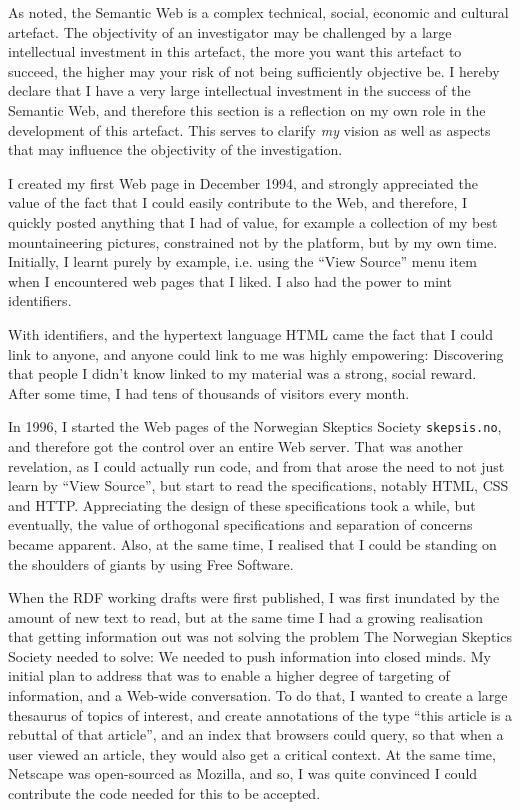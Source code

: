 As noted, the Semantic Web is a complex technical, social, economic
and cultural artefact. The objectivity of an investigator may be
challenged by a large intellectual investment in this artefact, the
more you want this artefact to succeed, the higher may your risk of
not being sufficiently objective be. I hereby declare that I have a
very large intellectual investment in the success of the Semantic Web,
and therefore this section is a reflection on my own role in the
development of this artefact. This serves to clarify \emph{my} vision
as well as aspects that may influence the objectivity of the
investigation.

I created my first Web page in December 1994, and strongly appreciated
the value of the fact that I could easily contribute to the Web, and
therefore, I quickly posted anything that I had of value, for example
a collection of my best mountaineering pictures, constrained not by
the platform, but by my own time. Initially, I learnt purely by
example, i.e. using the ``View Source'' menu item when I encountered
web pages that I liked. I also had the power to mint identifiers. 

With identifiers, and the hypertext language HTML came the fact that I
could link to anyone, and anyone could link to me was highly
empowering: Discovering that people I didn't know linked to my
material was a strong, social reward. After some time, I had tens of
thousands of visitors every month.

In 1996, I started the Web pages of the Norwegian Skeptics Society
\texttt{skepsis.no}, and therefore got the control over an entire Web
server. That was another revelation, as I could actually run code, and
from that arose the need to not just learn by ``View Source'', but
start to read the specifications, notably HTML, CSS and
HTTP. Appreciating the design of these specifications took a while,
but eventually, the value of orthogonal specifications and separation
of concerns became apparent. Also, at the same time, I realised that I
could be standing on the shoulders of giants by using Free Software.

When the RDF working drafts were first published, I was first
inundated by the amount of new text to read, but at the same time I
had a growing realisation that getting information out was not solving
the problem The Norwegian Skeptics Society needed to solve: We needed
to push information into closed minds. My initial plan to address that
was to enable a higher degree of targeting of information, and a Web-wide
conversation. To do that, I wanted to create a large thesaurus of
topics of interest, and create annotations of the type ``this article
is a rebuttal of that article'', and an index that browsers could
query, so that when a user viewed an article, they would also get a
critical context. At the same time, Netscape was open-sourced as
Mozilla, and so, I was quite convinced I could contribute the code
needed for this to be accepted. 

